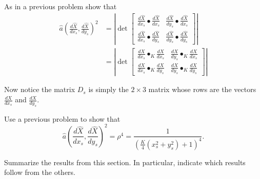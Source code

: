 \documentclass{ximera}
\begin{document}
\begin{problem}
As in a previous problem show that%
\begin{align*}
\hat{a}\left(  \frac{d\hat{X}}{dx_{s}},\frac{d\hat{X}}{dy_{s}}\right)  ^{2}
&  =\left\vert
\det
\begin{bmatrix}
\frac{d\hat{X}}{dx_{s}}\bullet\frac{d\hat{X}}{dx_{s}} & \frac{d\hat{X}}%
{dy_{s}}\bullet\frac{d\hat{X}}{dx_{s}}\\
\frac{d\hat{X}}{dx_{s}}\bullet\frac{d\hat{X}}{dy_{s}} & \frac{d\hat{X}}%
{dy_{s}}\bullet\frac{d\hat{X}}{dy_{s}}%
\end{bmatrix}
\right\vert \\
&  =\left\vert
\det
\begin{bmatrix}
\frac{dX}{dx_{s}}\bullet_{K}\frac{dX}{dx_{s}} & \frac{dX}{dy_{s}}\bullet
_{K}\frac{dX}{dx_{s}}\\
\frac{dX}{dx_{s}}\bullet_{K}\frac{dX}{dy_{s}} & \frac{dX}{dy_{s}}\bullet
_{K}\frac{dX}{dy_{s}}%
\end{bmatrix}
\right\vert
\end{align*}

\end{problem}

Now notice the matrix $D_{s}$ is simply the $2\times3$ matrix whose
rows are the vectors $\frac{dX}{dx_{s}}$ and $\frac{dX}{dy_{s}}$.

\begin{problem}
Use a previous problem to show that%
\[
\hat{a}\left(  \frac{d\hat{X}}{dx_{s}},\frac{d\hat{X}}{dy_{s}}\right)
^{2}=\rho^{4}=\frac{1}{\left(  \frac{K}{4}\left(  x_{s}^{2}+y_{s}^{2}\right)
+1\right)  ^{4}}.
\]
\end{problem}


\begin{problem}
Summarize the results from this section. In particular, indicate which
results follow from the others.
\begin{freeResponse}
\end{freeResponse}
\end{problem}
\end{document}
